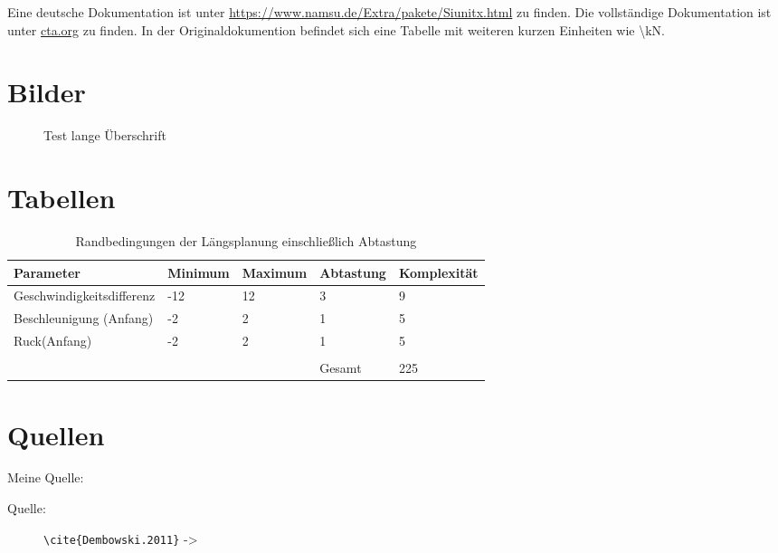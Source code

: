 Eine deutsche Dokumentation ist unter \href{https://www.namsu.de/Extra/pakete/Siunitx.html}{https://www.namsu.de/Extra/pakete/Siunitx.html} zu finden.
Die vollständige Dokumentation ist unter \href{https://ctan.org/pkg/siunitx?lang=de}{cta.org} zu finden. In der Originaldokumention befindet sich eine Tabelle mit weiteren kurzen Einheiten wie \textbackslash kN.

	 
\section{Bilder}
\label{sec:bilder}

\begin{figure}[H]
	\centering
	
	\caption[Ü-kurz]{Test lange Überschrift}
	\label{abb:test}
\end{figure}


\section{Tabellen}
\label{sec:tabellen}

\begin{table}[H]%
	\centering
		\caption[Kurz für Verzeichnis]{Randbedingungen der Längsplanung einschließlich Abtastung}
		\label{tab:rand}
	\begin{tabular}{p{4.7cm}|p{2cm}|p{2cm}|p{2cm}|p{2.3cm}}
		\rowcolor{headrowcolor}
		Parameter & Minimum & Maximum & Abtastung & Komplexität \\ \hline
		Geschwindigkeitsdifferenz & -12 & 12 & 3 & 9 \\ 
		Beschleunigung (Anfang) & -2 & 2 & 1 & 5 \\ 
		Ruck(Anfang) & -2 & 2 & 1 & 5 \\ 
		& & & & \\
		&  &  & Gesamt & 225 \\ 
	\end{tabular} 

	\label{tab:param_raster_laengs}
\end{table}


\section{Quellen}
\label{sec:quellen}

Meine Quelle: 
\begin{description}
	\item[Quelle:] \verb=\cite{Dembowski.2011}= -> \cite{Dembowski.2011}
\end{description}
